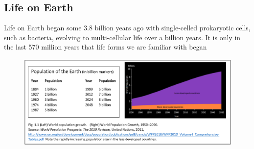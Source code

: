 \begin{multicols}{2}
\section{Life on Earth}

{\parfillskip=0pt
Life on Earth began some 3.8 billion years ago with single-celled prokaryotic cells, such as bacteria, evolving to multi-cellular life over a billion years. It is only in the last 570 million years that life forms we are familiar with began\par}

\end{multicols}

\begin{figure}[H]
\centering
\includegraphics[scale=1.15]{src/Figures/chap1/1.eps}
\end{figure}

